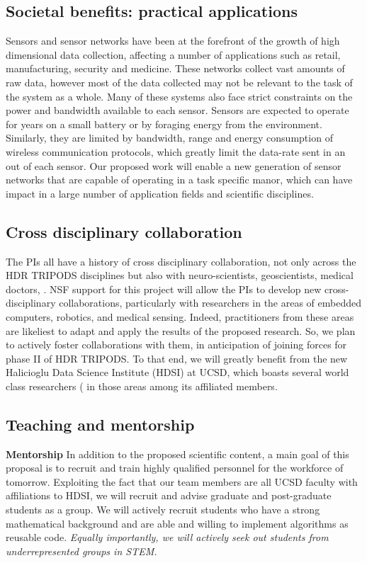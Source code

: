 \documentclass{article}
\begin{document}
\subsection*{Societal benefits: practical applications}
Sensors and sensor networks have been at the forefront of the growth of high dimensional data collection, affecting a number of applications such as
retail, manufacturing, security and medicine. These networks
collect vast amounts of raw data, however most of the data collected may not be relevant to the
task of the system as a whole.  Many of these systems also face strict constraints on the power and bandwidth available to each sensor.
Sensors are expected to operate for years on a small battery or by
foraging energy from the environment. Similarly, they are limited by 
bandwidth, range and energy consumption of wireless communication
protocols, which greatly limit the data-rate sent in an out of each
sensor.  Our proposed work will enable a new generation of sensor networks that are capable of operating in a task specific manor, which can have impact in a large number of application fields and scientific disciplines.
\subsection*{Cross disciplinary collaboration}
The PIs all have a history of cross disciplinary collaboration, not only across the HDR TRIPODS disciplines but also with neuro-scientists, geoscientists, medical doctors, . NSF support for this project will allow the PIs to develop new cross-disciplinary collaborations, particularly with researchers in the areas of embedded computers, robotics, and medical sensing. Indeed, practitioners from these areas are likeliest to adapt and apply the results of the proposed research. So, we plan to actively foster collaborations with them, in anticipation of joining forces for phase II of HDR TRIPODS. To that end, we will greatly benefit from the new Halicioglu Data Science Institute (HDSI) at UCSD, which boasts several world class researchers ( in those areas among its affiliated members. 
\subsection*{Teaching and mentorship}
{\bf Mentorship} In addition to the proposed scientific content, a main goal of this proposal is to recruit and train highly qualified personnel for the workforce of tomorrow. Exploiting the fact that our team members are all UCSD faculty with affiliations to HDSI, we will recruit and advise graduate and post-graduate students as a
group. We will actively recruit students who have a strong
mathematical background and are able and willing to implement
algorithms as reusable code. \emph{Equally importantly, we will actively seek out students from underrepresented groups in STEM.}
\end{document}
